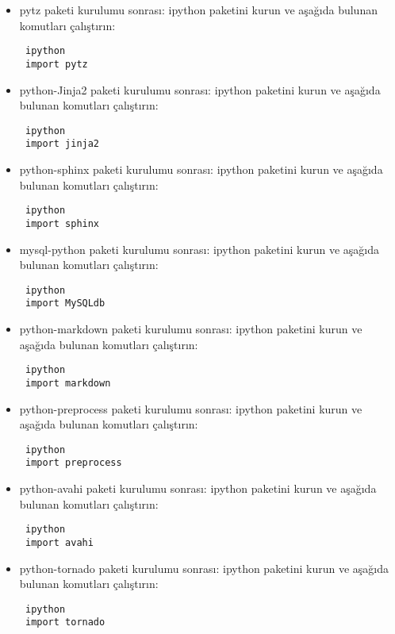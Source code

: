 \documentclass[a4paper,10pt]{article}
\begin{document}
\begin{itemize}
\item pytz paketi kurulumu sonrası:
ipython paketini kurun ve aşağıda bulunan komutları çalıştırın:
\begin{verbatim}
 ipython
 import pytz
\end{verbatim}

\item python-Jinja2 paketi kurulumu sonrası:
ipython paketini kurun ve aşağıda bulunan komutları çalıştırın:
\begin{verbatim}
 ipython
 import jinja2
\end{verbatim}

\item python-sphinx paketi kurulumu sonrası:
ipython paketini kurun ve aşağıda bulunan komutları çalıştırın:
\begin{verbatim}
 ipython
 import sphinx
\end{verbatim}


\item mysql-python paketi kurulumu sonrası:
ipython paketini kurun ve aşağıda bulunan komutları çalıştırın:
\begin{verbatim}
 ipython
 import MySQLdb
\end{verbatim}

\item python-markdown paketi kurulumu sonrası:
ipython paketini kurun ve aşağıda bulunan komutları çalıştırın:
\begin{verbatim}
 ipython
 import markdown
\end{verbatim}

\item python-preprocess paketi kurulumu sonrası:
ipython paketini kurun ve aşağıda bulunan komutları çalıştırın:
\begin{verbatim}
 ipython
 import preprocess
\end{verbatim}

\item python-avahi paketi kurulumu sonrası:
ipython paketini kurun ve aşağıda bulunan komutları çalıştırın:
\begin{verbatim}
 ipython
 import avahi
\end{verbatim}

\item python-tornado paketi kurulumu sonrası:
ipython paketini kurun ve aşağıda bulunan komutları çalıştırın:
\begin{verbatim}
 ipython
 import tornado
\end{verbatim}


\end{itemize}
\end{document}
